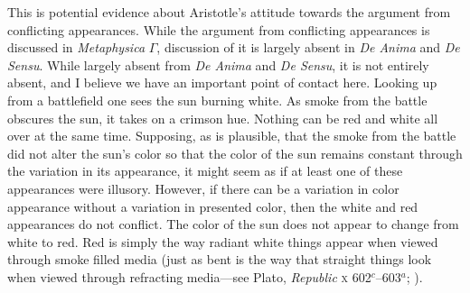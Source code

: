 This is potential evidence about Aristotle's attitude towards the argument from conflicting appearances. While the argument from conflicting appearances is discussed in \emph{Metaphysica} \( \Gamma \), discussion of it is largely absent in \emph{De Anima} and \emph{De Sensu}. While largely absent from \emph{De Anima} and \emph{De Sensu}, it is not entirely absent, and I believe we have an important point of contact here. Looking up from a battlefield one sees the sun burning white. As smoke from the battle obscures the sun, it takes on a crimson hue. Nothing can be red and white all over at the same time. Supposing, as is plausible, that the smoke from the battle did not alter the sun's color so that the color of the sun remains constant through the variation in its appearance, it might seem as if at least one of these appearances were illusory. However, if there can be a variation in color appearance without a variation in presented color, then the white and red appearances do not conflict. The color of the sun does not appear to change from white to red. Red is simply the way radiant white things appear when viewed through smoke filled media (just as bent is the way that straight things look when viewed through refracting media---see Plato, \emph{Republic} \textsc{x} 602\( ^{c} \)--603\( ^{a} \); \citealt{Austin:1962lr}).

